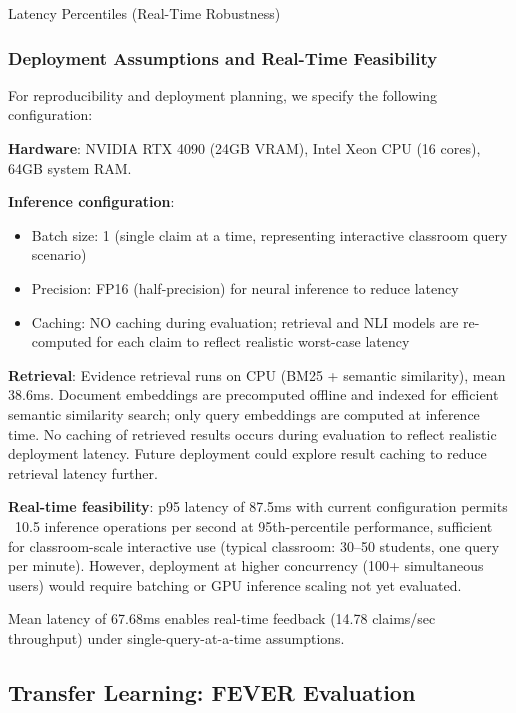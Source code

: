 Latency Percentiles (Real-Time Robustness)

\subsubsection{Deployment Assumptions and Real-Time Feasibility}\label{deployment-assumptions-and-real-time-feasibility}

For reproducibility and deployment planning, we specify the following configuration:

\textbf{Hardware}: NVIDIA RTX 4090 (24GB VRAM), Intel Xeon CPU (16 cores), 64GB system RAM.

\textbf{Inference configuration}:

\begin{itemize}
\item
  Batch size: 1 (single claim at a time, representing interactive classroom query scenario)
\item
  Precision: FP16 (half-precision) for neural inference to reduce latency
\item
  Caching: NO caching during evaluation; retrieval and NLI models are re-computed for each claim to reflect realistic worst-case latency
\end{itemize}

\textbf{Retrieval}: Evidence retrieval runs on CPU (BM25 + semantic similarity), mean 38.6ms. Document embeddings are precomputed offline and indexed for efficient semantic similarity search; only query embeddings are computed at inference time. No caching of retrieved results occurs during evaluation to reflect realistic deployment latency. Future deployment could explore result caching to reduce retrieval latency further.

\textbf{Real-time feasibility}: p95 latency of 87.5ms with current configuration permits ~10.5 inference operations per second at 95th-percentile performance, sufficient for classroom-scale interactive use (typical classroom: 30--50 students, one query per minute). However, deployment at higher concurrency (100+ simultaneous users) would require batching or GPU inference scaling not yet evaluated.

Mean latency of 67.68ms enables real-time feedback (14.78 claims/sec throughput) under single-query-at-a-time assumptions.

\subsection{Transfer Learning: FEVER Evaluation}\label{transfer-learning-fever-evaluation}


